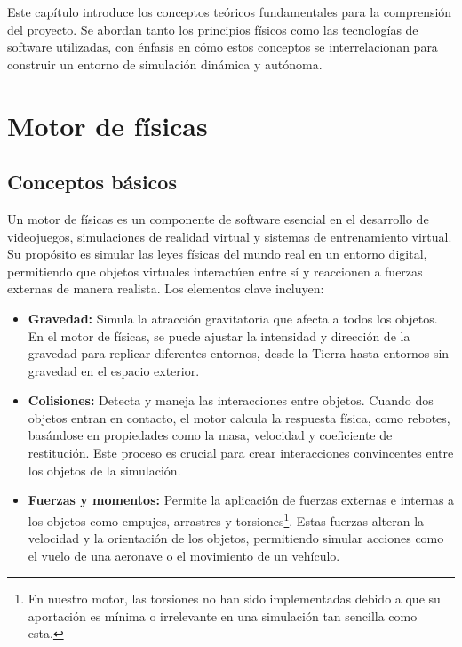 Este capítulo introduce los conceptos teóricos fundamentales para la comprensión del proyecto. Se abordan tanto los principios físicos como las tecnologías de software utilizadas, con énfasis en cómo estos conceptos se interrelacionan para construir un entorno de simulación dinámica y autónoma.

\section{Motor de físicas}

\subsection{Conceptos básicos}
Un motor de físicas es un componente de software esencial en el desarrollo de videojuegos, simulaciones de realidad virtual y sistemas de entrenamiento virtual. Su propósito es simular las leyes físicas del mundo real en un entorno digital, permitiendo que objetos virtuales interactúen entre sí y reaccionen a fuerzas externas de manera realista. Los elementos clave incluyen:

\begin{itemize}
    \item \textbf{Gravedad:} Simula la atracción gravitatoria que afecta a todos los objetos. En el motor de físicas, se puede ajustar la intensidad y dirección de la gravedad para replicar diferentes entornos, desde la Tierra hasta entornos sin gravedad en el espacio exterior.
    
    \item \textbf{Colisiones:} Detecta y maneja las interacciones entre objetos. Cuando dos objetos entran en contacto, el motor calcula la respuesta física, como rebotes, basándose en propiedades como la masa, velocidad y coeficiente de restitución. Este proceso es crucial para crear interacciones convincentes entre los objetos de la simulación.
    
    \item \textbf{Fuerzas y momentos:} Permite la aplicación de fuerzas externas e internas a los objetos como empujes, arrastres y torsiones\footnote{En nuestro motor, las torsiones no han sido implementadas debido a que su aportación es mínima o irrelevante en una simulación tan sencilla como esta.}. Estas fuerzas alteran la velocidad y la orientación de los objetos, permitiendo simular acciones como el vuelo de una aeronave o el movimiento de un vehículo.
\end{itemize}


